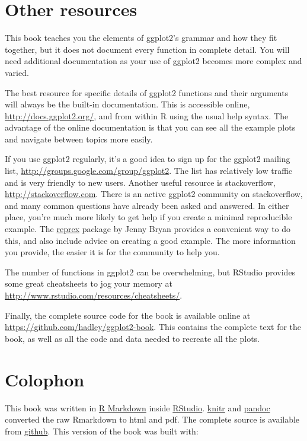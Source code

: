 \section{Other resources}\label{sec:other-resources}

This book teaches you the elements of ggplot2's grammar and how they fit
together, but it does not document every function in complete detail.
You will need additional documentation as your use of ggplot2 becomes
more complex and varied.

The best resource for specific details of ggplot2 functions and their
arguments will always be the built-in documentation. This is accessible
online, \url{http://docs.ggplot2.org/}, and from within R using the
usual help syntax. The advantage of the online documentation is that you
can see all the example plots and navigate between topics more easily.

If you use ggplot2 regularly, it's a good idea to sign up for the
ggplot2 mailing list, \url{http://groups.google.com/group/ggplot2}. The
list has relatively low traffic and is very friendly to new users.
Another useful resource is stackoverflow,
\url{http://stackoverflow.com}. There is an active ggplot2 community on
stackoverflow, and many common questions have already been asked and
answered. In either place, you're much more likely to get help if you
create a minimal reproducible example. The
\href{https://github.com/jennybc/reprex}{reprex} package by Jenny Bryan
provides a convenient way to do this, and also include advice on
creating a good example. The more information you provide, the easier it
is for the community to help you.

The number of functions in ggplot2 can be overwhelming, but RStudio
provides some great cheatsheets to jog your memory at
\url{http://www.rstudio.com/resources/cheatsheets/}.

Finally, the complete source code for the book is available online at
\url{https://github.com/hadley/ggplot2-book}. This contains the complete
text for the book, as well as all the code and data needed to recreate
all the plots.

\section{Colophon}\label{colophon}

This book was written in \href{http://rmarkdown.rstudio.com/}{R
Markdown} inside \href{http://www.rstudio.com/ide/}{RStudio}.
\href{http://yihui.name/knitr/}{knitr} and
\href{http://johnmacfarlane.net/pandoc/}{pandoc} converted the raw
Rmarkdown to html and pdf. The complete source is available from
\href{https://github.com/hadley/ggplot2-book}{github}. This version of
the book was built with:

